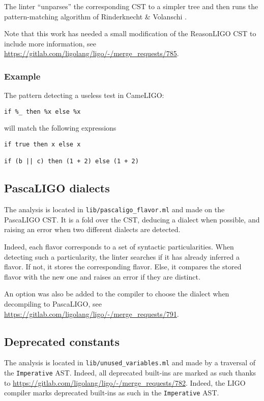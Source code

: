 \documentclass[10pt,a4paper]{article}
\begin{document}
The linter ``unparses'' the corresponding CST to a simpler tree and
then runs the pattern-matching algorithm of Rinderknecht \& Volanschi
\cite{unparsedpatterns}.

Note that this work has needed a small modification of the ReasonLIGO
CST to include more information, see
\url{https://gitlab.com/ligolang/ligo/-/merge_requests/785}.

\subsubsection{Example}
The pattern detecting a useless test in CameLIGO:
\begin{verbatim}
if %_ then %x else %x
\end{verbatim}

will match the following expressions
\begin{verbatim}
if true then x else x

if (b || c) then (1 + 2) else (1 + 2)
\end{verbatim}


\subsection{PascaLIGO dialects}
The analysis is located in \verb|lib/pascaligo_flavor.ml| and made on
the PascaLIGO CST. It is a fold over the CST, deducing a dialect when
possible, and raising an error when two different dialects are
detected.

Indeed, each flavor corresponds to a set of syntactic particularities.
When detecting such a particularity, the linter searches if it has already
inferred a flavor. If not, it stores the corresponding flavor. Else, it
compares the stored flavor with the new one and raises an error if they
are distinct.

An option was also be added to the compiler to choose the dialect when
decompiling to PascaLIGO, see
\url{https://gitlab.com/ligolang/ligo/-/merge_requests/791}.

\subsection{Deprecated constants}

The analysis is located in \verb|lib/unused_variables.ml| and made by
a traversal of the \verb|Imperative| AST. Indeed, all deprecated
built-ins are marked as such thanks to
\url{https://gitlab.com/ligolang/ligo/-/merge_requests/782}.
Indeed, the LIGO compiler marks deprecated built-ins as such in the
\verb|Imperative| AST.
\end{document}
